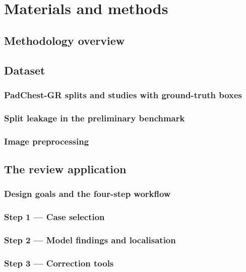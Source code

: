 \chapter{Materials and methods}
\label{ch:methods}


\section{Methodology overview}

\section{Dataset}
\subsection{PadChest-GR splits and studies with ground-truth boxes}
\subsection{Split leakage in the preliminary benchmark}\label{sec:leakage}
\subsection{Image preprocessing}

\section{The review application}\label{sec:app}
\subsection{Design goals and the four-step workflow}
\subsection{Step 1 --- Case selection}
\subsection{Step 2 --- Model findings and localisation}
\subsection{Step 3 --- Correction tools}
